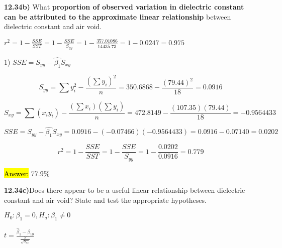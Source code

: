 \documentclass{article}
\begin{document}
\vspace{5mm}

\textbf{12.34b)} What \textbf{proportion of observed variation in dielectric constant can be attributed to the approximate linear relationship} between dielectric constant and air void.

\vspace{2mm}


$r^{2}=1-\frac{SSE}{SST}=1-\frac{SSE}{S_{yy}}=1-\frac{357.01086}{14435.73}=1-0.0247=0.975$

\vspace{2mm}


1) $SSE=S_{yy}-\hat{\beta_{1}}S_{xy}$

\vspace{2mm}

$$S_{yy}=\sum y_{i}^{2}-\frac{(\sum y_{i})^{2}}{n}=350.6868-\frac{(79.44)^{2}}{18}=0.0916$$

\vspace{2mm}


$$S_{xy}=\sum (x_{i}y_{i})-\frac{(\sum x_{i})(\sum y_{i})}{n}=472.8149-\frac{(107.35)(79.44)}{18}=-0.9564433$$

\vspace{2mm}

$SSE=S_{yy}-\hat{\beta_{1}}S_{xy}=0.0916-(-0.07466)(-0.9564433)=0.0916-0.07140=0.0202$

\vspace{2mm}

$$r^{2}=1-\frac{SSE}{SST}=1-\frac{SSE}{S_{yy}}=1-\frac{0.0202}{0.0916}=0.779$$

\vspace{2mm}

\hl{Answer:} 77.9\%










\vspace{5mm}


\textbf{12.34c)}Does there appear to be a useful linear relationship between dielectric constant and air void? State and test the appropriate hypotheses.



$H_{0}: \beta_{1}=0,  H_{a}:  \beta_{1} \ne 0$

\vspace{2mm}

$t=\frac{\hat{\beta}_{1}-\beta_{10}}{\frac{S}{\sqrt{S_{xx}}}}$
\end{document}
